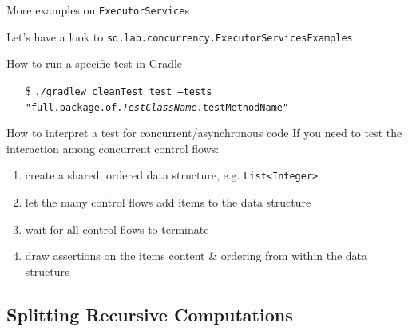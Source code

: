 \documentclass{beamer}\mode<presentation>{\usetheme{AMSBolognaFC}}
\begin{document}
\begin{frame}[c]{More examples on \texttt{ExecutorService}s}

	Let's have a look to \texttt{sd.lab.concurrency.\alert{ExecutorServicesExamples}}

	\vfill

	\begin{block}{How to run a specific test in Gradle}
		\begin{itemize}
			\item[\$] \texttt{./gradlew cleanTest test --tests "full.package.of.\textit{TestClassName}.\alert{testMethodName}"}
		\end{itemize}
	\end{block}

	\vfill

	\begin{block}{How to interpret a test for concurrent/asynchronous code}
		If you need to test the interaction among \alert{concurrent} control flows:
		\begin{enumerate}
			\item create a shared, ordered data structure, e.g. \texttt{List<\alert{Integer}>}

			\item let the many control flows add items to the data structure

			\item wait for all control flows to terminate

			\item draw assertions on the items content \& ordering from within the data structure
		\end{enumerate}
	\end{block}

\end{frame}

\subsection{Splitting Recursive Computations}
\end{document}
